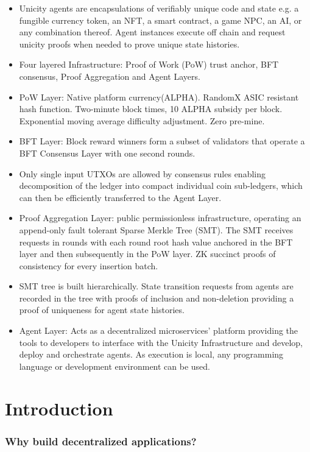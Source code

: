 \documentclass{article}
\begin{document}
\begin{itemize}
    \item Unicity agents are encapsulations of verifiably unique code and state e.g. a fungible currency token, an NFT, a smart contract,  a game NPC, an AI, or any combination thereof. Agent instances execute off chain and request unicity proofs when needed to prove unique state histories.
    \item  Four layered Infrastructure: Proof of Work (PoW) trust anchor, BFT consensus, Proof Aggregation and Agent Layers.
    \item PoW Layer: Native platform currency(ALPHA). RandomX ASIC resistant hash function. Two-minute block times, 10 ALPHA subsidy per block. Exponential moving average difficulty adjustment. Zero pre-mine.
    \item BFT Layer: Block reward winners form a subset of validators that operate a BFT Consensus Layer with one second rounds.
    \item Only single input UTXOs are allowed by consensus rules enabling decomposition of the ledger into compact individual coin sub-ledgers, which can then be efficiently transferred to the Agent Layer.
    \item Proof Aggregation Layer: public permissionless infrastructure, operating an append-only fault tolerant Sparse Merkle Tree (SMT). The SMT receives requests in rounds with each round root hash value anchored in the BFT layer and then subsequently in the PoW layer. ZK succinct proofs of consistency for every insertion batch.
    \item SMT tree is built hierarchically. State transition requests from agents are recorded in the tree with proofs of inclusion and non-deletion providing a proof of uniqueness for agent state histories.
    \item Agent Layer: Acts as a decentralized microservices' platform providing the tools to developers to interface with the Unicity Infrastructure and develop, deploy and orchestrate agents. As execution is local, any programming language or development environment can be used.
\end{itemize}


\section{Introduction}

\subsubsection{Why build decentralized applications?}
\end{document}
